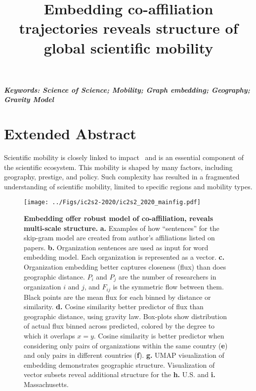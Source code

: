\documentclass[a4paper,12pt]{article}
\title{Embedding co-affiliation trajectories reveals structure of global scientific mobility}
\author[]{} %
\date{}
\begin{document}
\maketitle
\thispagestyle{fancy}

\vspace{-6em}
\begin{center}
\textbf{\textit{Keywords: Science of Science; Mobility; Graph embedding; Geography; Gravity Model}}
\newline
\end{center}

\section*{Extended Abstract}

Scientific mobility is closely linked to impact~\autocite{sugimoto_scientists_2017} and is an essential component of the scientific ecosystem.
This mobility is shaped by many factors, including geography, prestige, and policy\autocite{deville_career_2014,clauset_systematic_2015}.
Such complexity has resulted in a fragmented understanding of scientific mobility, limited to specific regions and mobility types.

\begin{figure}[h!]
	\centering
	\texttt{[image: ../Figs/ic2s2-2020/ic2s2\_2020\_mainfig.pdf]}
	\caption{ 
	\textbf{Embedding offer robust model of co-affiliation, reveals multi-scale structure.}
	\textbf{a.} Examples of how ``sentences'' for the skip-gram model are created from author's affiliations listed on papers.
	\textbf{b.} Organization sentences are used as input for word embedding model. Each organization is represented as a vector.
	\textbf{c.} Organization embedding better captures closeness (flux) than does geographic distance. 
 $P_{i}$ and $P_{j}$ are the number of researchers in organization $i$ and $j$, and $F_{ij}$ is the symmetric flow between them.
	Black points are the mean flux for each binned by distance or similarity. 
	\textbf{d.} Cosine similarity better predictor of flux than geographic distance, using gravity law.
	Box-plots show distribution of actual flux binned across predicted, colored by the degree to which it overlaps $x = y$. 
	Cosine similarity is better predictor when considering only pairs of organizations within the same country (\textbf{e}) and only pairs in different countries (\textbf{f}). 
	\textbf{g.} UMAP visualization of embedding demonstrates geographic structure.
	Visualization of vector subsets reveal additional structure for the \textbf{h.} U.S. and \textbf{i.} Massachusetts. 
	 }
	\label{fig:image}
\end{figure}
\end{document}
